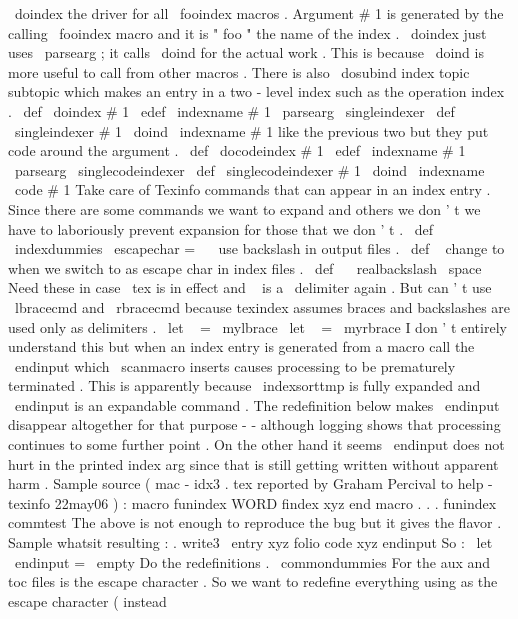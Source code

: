 {\
doindex
the
driver
for
all
\
fooindex
macros
.
%
Argument
#
1
is
generated
by
the
calling
\
fooindex
macro
%
and
it
is
"
foo
"
the
name
of
the
index
.
%
\
doindex
just
uses
\
parsearg
;
it
calls
\
doind
for
the
actual
work
.
%
This
is
because
\
doind
is
more
useful
to
call
from
other
macros
.
%
There
is
also
\
dosubind
{
index
}
{
topic
}
{
subtopic
}
%
which
makes
an
entry
in
a
two
-
level
index
such
as
the
operation
index
.
\
def
\
doindex
#
1
{
\
edef
\
indexname
{
#
1
}
\
parsearg
\
singleindexer
}
\
def
\
singleindexer
#
1
{
\
doind
{
\
indexname
}
{
#
1
}
}
%
like
the
previous
two
but
they
put
code
around
the
argument
.
\
def
\
docodeindex
#
1
{
\
edef
\
indexname
{
#
1
}
\
parsearg
\
singlecodeindexer
}
\
def
\
singlecodeindexer
#
1
{
\
doind
{
\
indexname
}
{
\
code
{
#
1
}
}
}
%
Take
care
of
Texinfo
commands
that
can
appear
in
an
index
entry
.
%
Since
there
are
some
commands
we
want
to
expand
and
others
we
don
'
t
%
we
have
to
laboriously
prevent
expansion
for
those
that
we
don
'
t
.
%
\
def
\
indexdummies
{
%
\
escapechar
=
\
\
%
use
backslash
in
output
files
.
\
def
\
{
}
%
change
to
when
we
switch
to
as
escape
char
in
index
files
.
\
def
\
{
\
realbackslash
\
space
}
%
%
%
Need
these
in
case
\
tex
is
in
effect
and
\
{
is
a
\
delimiter
again
.
%
But
can
'
t
use
\
lbracecmd
and
\
rbracecmd
because
texindex
assumes
%
braces
and
backslashes
are
used
only
as
delimiters
.
\
let
\
{
=
\
mylbrace
\
let
\
}
=
\
myrbrace
%
%
I
don
'
t
entirely
understand
this
but
when
an
index
entry
is
%
generated
from
a
macro
call
the
\
endinput
which
\
scanmacro
inserts
%
causes
processing
to
be
prematurely
terminated
.
This
is
%
apparently
because
\
indexsorttmp
is
fully
expanded
and
\
endinput
%
is
an
expandable
command
.
The
redefinition
below
makes
\
endinput
%
disappear
altogether
for
that
purpose
-
-
although
logging
shows
that
%
processing
continues
to
some
further
point
.
On
the
other
hand
it
%
seems
\
endinput
does
not
hurt
in
the
printed
index
arg
since
that
%
is
still
getting
written
without
apparent
harm
.
%
%
Sample
source
(
mac
-
idx3
.
tex
reported
by
Graham
Percival
to
%
help
-
texinfo
22may06
)
:
%
macro
funindex
{
WORD
}
%
findex
xyz
%
end
macro
%
.
.
.
%
funindex
commtest
%
%
The
above
is
not
enough
to
reproduce
the
bug
but
it
gives
the
flavor
.
%
%
Sample
whatsit
resulting
:
%
.
write3
{
\
entry
{
xyz
}
{
folio
}
{
code
{
xyz
endinput
}
}
}
%
%
So
:
\
let
\
endinput
=
\
empty
%
%
Do
the
redefinitions
.
\
commondummies
}
%
For
the
aux
and
toc
files
is
the
escape
character
.
So
we
want
to
%
redefine
everything
using
as
the
escape
character
(
instead
}}
